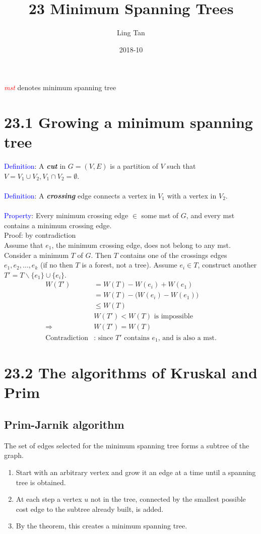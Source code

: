 \documentclass[a4paper]{article}
\title{23 Minimum Spanning Trees}
\author{Ling Tan}
\date{2018-10}
\begin{document}

\textcolor{red}{\textit{mst}} denotes minimum spanning tree
\section*{23.1 Growing a minimum spanning tree}
\textcolor{blue}{Definition}: A \textbf{\textit{cut}} in $G=(V,E)$ is a partition of $V$ such that $V=V_1\cup V_2, V_1\cap V_2=\emptyset$. \\
\\
\textcolor{blue}{Definition}: A \textbf{\textit{crossing}} edge connects a vertex in $V_1$ with a vertex in $V_2$.\\
\\
\textcolor{blue}{Property}: Every minimum crossing edge $\in$ some mst of $G$, and every mst contains a minimum crossing edge.\\
Proof: by contradiction\\
Assume that $e_1$, the minimum crossing edge, does not belong to any mst. Consider a minimum $T$ of $G$. Then $T$ contains one of the crossings edges $e_1,e_2,\ldots, e_k$ (if no then $T$ is a forest, not a tree). Assume $e_i\in T$, construct another $T'=T \backslash \{e_1\}\cup \{e_i\}$.
\begin{align*}
W(T')&=W(T)-W(e_i)+W(e_1)\\
&= W(T)-\big(W(e_i)-W(e_1)\big)\\
&\leq W(T) \\
&W(T')<W(T)\text{ is impossible}\\
\Rightarrow &W(T')=W(T)\\
\text{Contradiction}&\text{: since $T'$ contains $e_1$, and is also a mst.} 
\end{align*}

\section*{23.2 The algorithms of Kruskal and Prim}

\subsection*{Prim-Jarnik algorithm}
The set of edges selected for the minimum spanning tree forms a subtree of the graph.
\begin{enumerate}
    \item Start with an arbitrary vertex and grow it an edge at a time until a spanning tree is obtained.
    \item At each step a vertex $u$ not in the tree, connected by the smallest possible cost edge to the subtree already built, is added.
    \item By the theorem, this creates a minimum spanning tree.
\end{enumerate}
\end{document}
